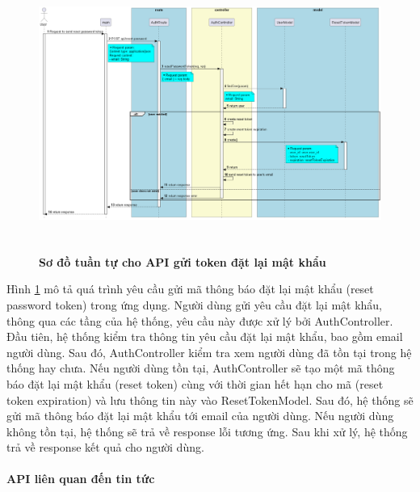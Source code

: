 \begin{figure}[H]
  \centering
  \includegraphics[width=16cm,height=9cm]{Images/server/sequence/server/resetPasswordToken.png}
  \caption[Sơ đồ tuần tự cho API gửi token đặt lại mật khẩu ]{\bfseries \fontsize{12pt}{0pt}
  \selectfont Sơ đồ tuần tự cho API gửi token đặt lại mật khẩu  }
  \label{resetPasswordToken} %
\end{figure}
Hình \ref{resetPasswordToken} mô tả quá trình yêu cầu gửi mã thông báo đặt lại mật khẩu (reset password token) trong ứng dụng. Người dùng gửi yêu cầu đặt lại mật khẩu, thông qua các tầng của hệ thống, yêu cầu này được xử lý bởi AuthController. Đầu tiên, hệ thống kiểm tra thông tin yêu cầu đặt lại mật khẩu, bao gồm email người dùng. Sau đó, AuthController kiểm tra xem người dùng đã tồn tại trong hệ thống hay chưa. Nếu người dùng tồn tại, AuthController sẽ tạo một mã thông báo đặt lại mật khẩu (reset token) cùng với thời gian hết hạn cho mã (reset token expiration) và lưu thông tin này vào ResetTokenModel. Sau đó, hệ thống sẽ gửi mã thông báo đặt lại mật khẩu tới email của người dùng. Nếu người dùng không tồn tại, hệ thống sẽ trả về response lỗi tương ứng. Sau khi xử lý, hệ thống trả về response kết quả cho người dùng.



\paragraph{API liên quan đến tin tức}
\mbox{}

